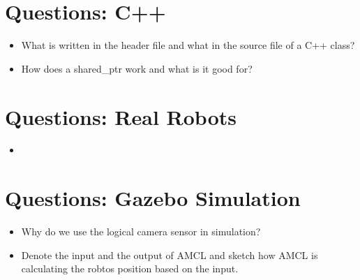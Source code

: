 \section{Questions: C++}
\label{sec:questions_c++}

\begin{itemize}
 \item What is written in the header file and what in the source file of a C++ class?
 \item How does a shared\_ptr work and what is it good for?
\end{itemize}

\section{Questions: Real Robots}
\label{sec:questions_robots}

\begin{itemize}
 \item 
\end{itemize}


\section{Questions: Gazebo Simulation}
\label{sec:questions_simulation}

\begin{itemize}
 \item Why do we use the logical camera sensor in simulation?
 \item Denote the input and the output of AMCL and sketch how AMCL is calculating the robtos position based on the input.
\end{itemize}
